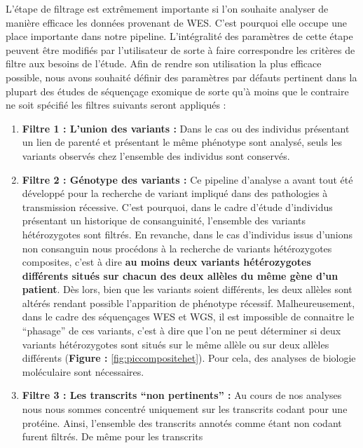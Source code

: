 \documentclass[12pt,twoside]{reedthesis}
\theoremstyle{definition}
\theoremstyle{definition}
\theoremstyle{remark}
\begin{document}
  L'étape de filtrage est extrêmement importante si l'on souhaite analyser
  de manière efficace les données provenant de WES. C'est pourquoi elle
  occupe une place importante dans notre pipeline. L'intégralité des
  paramètres de cette étape peuvent être modifiés par l'utilisateur de
  sorte à faire correspondre les critères de filtre aux besoins de
  l'étude. Afin de rendre son utilisation la plus efficace possible, nous
  avons souhaité définir des paramètres par défauts pertinent dans la
  plupart des études de séquençage exomique de sorte qu'à moins que le
  contraire ne soit spécifié les filtres suivants seront appliqués :
  
  \begin{enumerate}
  \def\labelenumi{\arabic{enumi}.}
  \item
    \textbf{Filtre 1 : L'union des variants :} Dans le cas ou des
    individus présentant un lien de parenté et présentant le même
    phénotype sont analysé, seuls les variants observés chez l'ensemble
    des individus sont conservés.
  \item
    \textbf{Filtre 2 : Génotype des variants :} Ce pipeline d'analyse a
    avant tout été développé pour la recherche de variant impliqué dans
    des pathologies à transmission récessive. C'est pourquoi, dans le
    cadre d'étude d'individus présentant un historique de consanguinité,
    l'ensemble des variants hétérozygotes sont filtrés. En revanche, dans
    le cas d'individus issus d'unions non consanguin nous procédons à la
    recherche de variants hétérozygotes composites, c'est à dire
    \textbf{au moins deux variants hétérozygotes différents situés sur
    chacun des deux allèles du même gène d'un patient}. Dès lors, bien que
    les variants soient différents, les deux allèles sont altérés rendant
    possible l'apparition de phénotype récessif. Malheureusement, dans le
    cadre des séquençages WES et WGS, il est impossible de connaitre le
    ``phasage'' de ces variants, c'est à dire que l'on ne peut déterminer
    si deux variants hétérozygotes sont situés sur le même allèle ou sur
    deux allèles différents (\textbf{Figure : }\ref{fig:piccompositehet}).
    Pour cela, des analyses de biologie moléculaire sont nécessaires.
  \item
    \textbf{Filtre 3 : Les transcrits ``non pertinents'' :} Au cours de
    nos analyses nous nous sommes concentré uniquement sur les transcrits
    codant pour une protéine. Ainsi, l'ensemble des transcrits annotés
    comme étant non codant furent filtrés. De même pour les transcrits

\end{enumerate}
\end{document}
